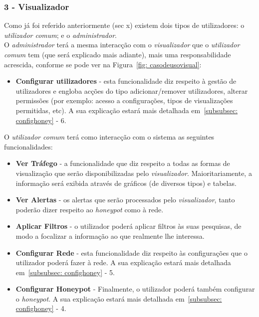 \newcommand{\uticomum}{\emph{utilizador comum}\xspace} 
\newcommand{\admini}{\emph{administrador}\xspace} 
\newcommand{\visualz}{\emph{visualizador}\xspace}
\subsubsection{\textbf{3 - Visualizador}}

Como já foi referido anteriormente (sec x) existem dois tipos de utilizadores: o \uticomum; e o \admini.\\ 

O \admini terá a mesma interacção com o \visualz que o \uticomum tem (que será explicado mais adiante), mais uma responsabilidade acrescida, 
conforme se pode ver na Figura~\ref{fig: casodeusovisual}:

\begin{itemize}
 \item \textbf{Configurar utilizadores} - esta funcionalidade diz respeito à gestão de utilizadores e engloba acções do tipo adicionar/remover utilizadores, 
 alterar permissões (por exemplo: acesso a configurações, tipos de visualizações permitidas, etc). A sua explicação estará mais detalhada em~\ref{subsubsec: confighoney} - 6.
\end{itemize}

O \uticomum terá como interacção com o sistema as seguintes funcionalidades:

\begin{itemize}
 \item \textbf{Ver Tráfego} - a funcionalidade que diz respeito a todas as formas de visualização que serão disponibilizadas pelo \visualz. Maioritariamente, a informação será exibida através de gráficos (de diversos tipos) e tabelas.
 \item \textbf{Ver Alertas} - os alertas que serão processados pelo \visualz, tanto poderão dizer respeito ao \emph{honeypot} como à rede.
 \item \textbf{Aplicar Filtros} - o utilizador poderá aplicar filtros às suas pesquisas, de modo a focalizar a informação ao que realmente lhe interessa.
 \item \textbf{Configurar Rede} - esta funcionalidade diz respeito às configurações que o utilizador poderá fazer à rede. A sua explicação estará mais detalhada em~\ref{subsubsec: confighoney} - 5.
 \item \textbf{Configurar Honeypot} - Finalmente, o utilizador poderá também configurar o \emph{honeypot}. A sua explicação estará mais detalhada em~\ref{subsubsec: confighoney} - 4.
\end{itemize}

